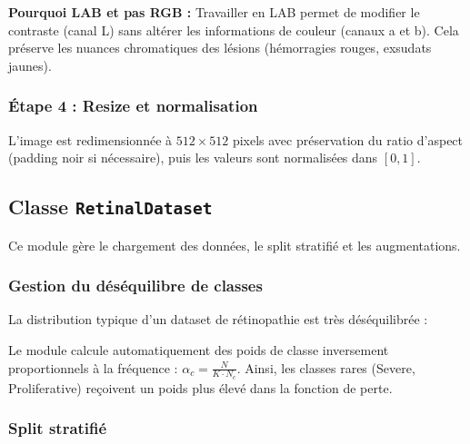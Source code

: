 \documentclass[11pt,a4paper]{article}
\begin{document}
\textbf{Pourquoi LAB et pas RGB :} Travailler en LAB permet de modifier le contraste (canal L) sans altérer les informations de couleur (canaux a et b). Cela préserve les nuances chromatiques des lésions (hémorragies rouges, exsudats jaunes).

\subsubsection{Étape 4 : Resize et normalisation}

L'image est redimensionnée à $512 \times 512$ pixels avec préservation du ratio d'aspect (padding noir si nécessaire), puis les valeurs sont normalisées dans $[0, 1]$.

\subsection{Classe \texttt{RetinalDataset}}

Ce module gère le chargement des données, le split stratifié et les augmentations.

\subsubsection{Gestion du déséquilibre de classes}

La distribution typique d'un dataset de rétinopathie est très déséquilibrée :

\begin{center}
\end{center}

Le module calcule automatiquement des poids de classe inversement proportionnels à la fréquence : $\alpha_c = \frac{N}{K \cdot N_c}$. Ainsi, les classes rares (Severe, Proliferative) reçoivent un poids plus élevé dans la fonction de perte.

\subsubsection{Split stratifié}
\end{document}
